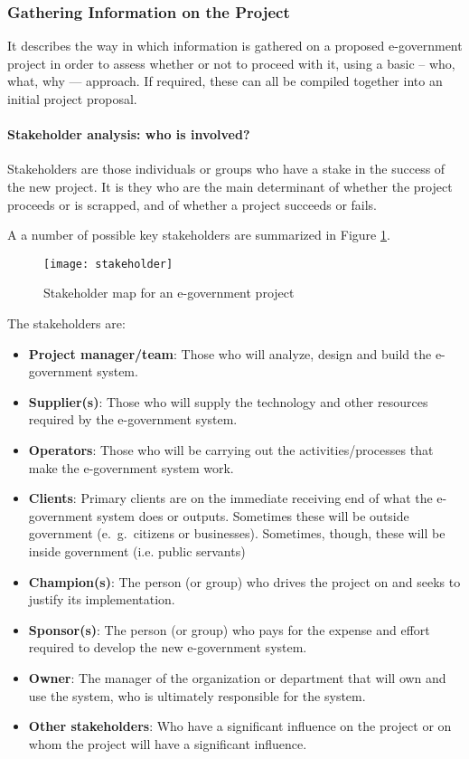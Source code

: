 \subsubsection{Gathering Information on	the Project}
It describes the way in which information is gathered on a proposed
e-government project in order to assess
whether or not to proceed with it, using
a basic – who, what, why — approach. If required, these can all be compiled together
into an initial project proposal.

\paragraph*{Stakeholder analysis: who is involved?}
Stakeholders are those individuals or groups
who have a stake in the success of the new
project. It is they who are the main determinant of whether the project proceeds or is
scrapped, and of whether a project succeeds
or fails.

A a number of possible key stakeholders are summarized in Figure \ref{fig:stakeholder}.

\begin{figure}[th]
	\centering
	\texttt{[image: stakeholder]}
	\caption{Stakeholder map for an e-government project}
	\label{fig:stakeholder}
\end{figure}


The stakeholders are:

\begin{itemize}
	\item \textbf{Project manager/team}: Those who will analyze, design and build the e-government
	system.
	\item \textbf{Supplier(s)}: Those who will supply the technology and other resources required
	by the e-government system.
	
	\item \textbf{Operators}: Those who will be carrying out	the activities/processes that make the
	e-government system work.
	
	\item \textbf{Clients}: Primary clients are on the immediate receiving end of what the
	e-government system does or outputs. Sometimes these will be outside government (e.\ g.\  citizens or businesses). Sometimes, though, these will be inside	government (i.e. public servants)
	
	\item \textbf{Champion(s)}: The person (or group) who drives the project on and seeks to justify
	its implementation.
	
	\item \textbf{Sponsor(s)}: The person (or group) who pays for the expense and effort required
	to develop the new e-government	system.
	
	 \item \textbf{Owner}: The manager of the organization or department that will own and use the
	system, who is ultimately responsible for the system.
	
	 \item \textbf{Other stakeholders}: Who have a significant influence on the project or on
	whom the project will have a significant
	influence.
\end{itemize}

